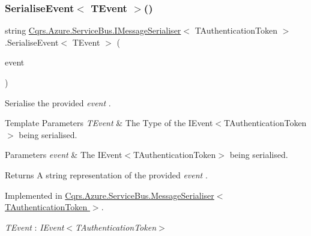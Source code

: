 \subsubsection{\texorpdfstring{Serialise\+Event$<$ T\+Event $>$()}{SerialiseEvent< TEvent >()}}
{\footnotesize\ttfamily string \hyperlink{interfaceCqrs_1_1Azure_1_1ServiceBus_1_1IMessageSerialiser}{Cqrs.\+Azure.\+Service\+Bus.\+I\+Message\+Serialiser}$<$ T\+Authentication\+Token $>$.Serialise\+Event$<$ T\+Event $>$ (\begin{DoxyParamCaption}\item[{T\+Event @}]{event }\end{DoxyParamCaption})}



Serialise the provided {\itshape event} . 


\begin{DoxyTemplParams}{Template Parameters}
{\em T\+Event} & The Type of the I\+Event$<$\+T\+Authentication\+Token$>$ being serialised.\\
\hline
\end{DoxyTemplParams}

\begin{DoxyParams}{Parameters}
{\em event} & The I\+Event$<$\+T\+Authentication\+Token$>$ being serialised.\\
\hline
\end{DoxyParams}
\begin{DoxyReturn}{Returns}
A string representation of the provided {\itshape event} .
\end{DoxyReturn}


Implemented in \hyperlink{classCqrs_1_1Azure_1_1ServiceBus_1_1MessageSerialiser_a5650683271dec423489b016da15d8d3d_a5650683271dec423489b016da15d8d3d}{Cqrs.\+Azure.\+Service\+Bus.\+Message\+Serialiser$<$ T\+Authentication\+Token $>$}.

\begin{Desc}
\item[Type Constraints]\begin{description}
\item[{\em T\+Event} : {\em I\+Event$<$T\+Authentication\+Token$>$}]\end{description}
\end{Desc}
